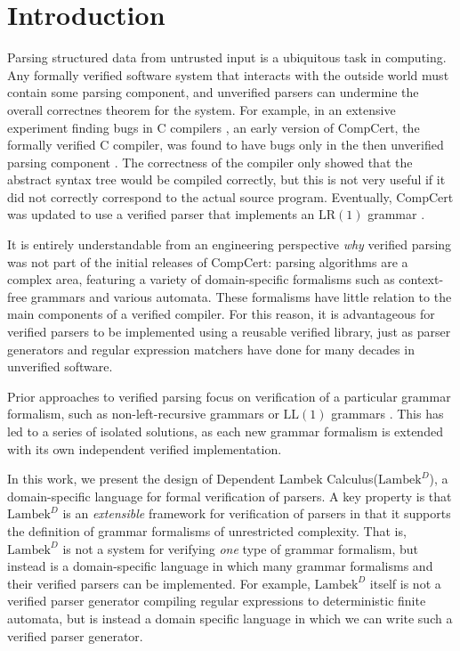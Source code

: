 \documentclass[acmsmall,nonacm]{acmart}
\newcommand{\theoryname}{Dependent Lambek Calculus\xspace}
\newcommand{\theoryabbv}{$\textrm{Lambek}^D$\xspace}
\newcommand{\LLL}{\textrm{LL}}
\newcommand{\LRR}{\textrm{LR}}
\newcommand{\LL}[1]{\LLL(#1)}
\newcommand{\LR}[1]{\LRR(#1)}
\begin{document}
\section{Introduction}
\label{sec:intro}
Parsing structured data from untrusted input is a ubiquitous task in
computing. Any formally verified software system that interacts with the outside
world must contain some parsing component, and unverified parsers can undermine the overall correctnes theorem for the system.
For example, in an extensive experiment finding bugs in C compilers
\cite{yangFindingUnderstandingBugs}, an early version of CompCert, the formally
verified C compiler, was found to have bugs only in the then
unverified parsing component \cite{leroy_formal_2009}.
The correctness of the compiler only showed that the abstract syntax tree would be compiled correctly, but this is
not very useful if it did not correctly correspond to the actual
source program. Eventually, CompCert
was updated to use a verified parser that implements
an $\LR{1}$ grammar
\cite{jourdanValidatingLRParsers2012}.

It is entirely understandable from an engineering perspective
\emph{why} verified parsing was not part of the initial releases of
CompCert: parsing algorithms are a complex area,
featuring a variety of domain-specific formalisms such as context-free
grammars and various automata. These formalisms have little relation
to the main components of a verified compiler. For this reason, it is
advantageous for verified parsers to be implemented using a reusable
verified library, just as parser generators and regular expression
matchers have done for many decades in unverified software.

Prior approaches to verified parsing focus on verification of a
particular grammar formalism, such as non-left-recursive grammars or
$\LL{1}$ grammars
\cite{lasserCoStarVerifiedALL2021,EdelmannZippy2020,danielssonTotalParserCombinators2010}.
This has led to a series of isolated solutions, as each new grammar formalism is extended with its own independent
verified implementation.

In this work, we present the design of \theoryname (\theoryabbv), a
domain-specific language for formal verification of parsers. A key
property is that \theoryabbv is an \emph{extensible} framework for
verification of parsers in that it supports the definition of grammar
formalisms of unrestricted complexity. That is, \theoryabbv is not a
system for verifying \emph{one} type of grammar formalism, but instead
is a domain-specific language in which many grammar formalisms and
their verified parsers can be implemented. For example, \theoryabbv itself is
not a verified parser generator compiling regular expressions to
deterministic finite automata, but is instead a domain specific
language in which we can write such a verified parser generator.
\end{document}
